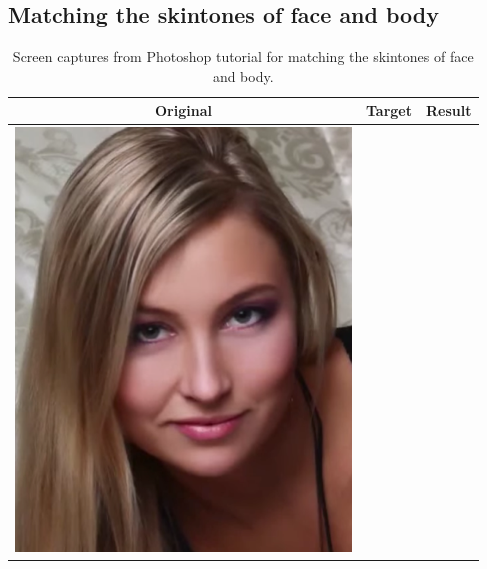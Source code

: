 \begin{longtable}{|c|c|}
\begin{minipage}{.29\textwidth}
  \end{minipage} \\
    \hline
\end{longtable}
\pagebreak

\subsection{Matching the skintones of face and body \cite{photoshop:match_body}}\label{app:photoshop_match_body}
\begin{longtable}{|c|c|c|}
    \caption{Screen captures from Photoshop tutorial for matching the skintones of face and body.}\\
    \hline
    Original & Target & Result \\
    \hline
  \begin{minipage}{.29\textwidth}
    \includegraphics[width=\textwidth,height=\textheight,keepaspectratio]{images/match_body_orig}
  \end{minipage} & 
  \begin{minipage}{.29\textwidth}

\end{minipage}
\end{longtable}
